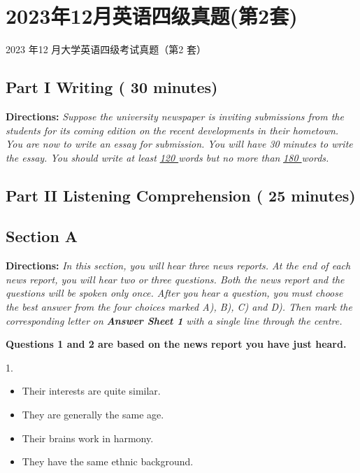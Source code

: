 \documentclass[UTF8,11pt]{ctexart}
\begin{document}
\section*{2023年12月英语四级真题(第2套)}
2023 年12 月大学英语四级考试真题（第2 套）


\subsection*{\textbf{Part I Writing} \textbf{( 30 minutes)}}


\textbf{Directions:} \textit{Suppose the university newspaper is inviting submissions from the students for its coming edition on} \textit{the recent developments in their hometown. You are now to write an essay for submission. You will have 30} \textit{minutes to write the essay. You should write at least }\textit{\uline{120 }}\textit{words but no more than }\textit{\uline{180 }}\textit{words.}


\subsection*{\textbf{Part II} \textbf{Listening Comprehension} \textbf{( 25 minutes)}}


\subsection*{\textbf{Section A}}


\textbf{Directions:} \textit{In this section, you will hear three news reports. At the end of each news report, you will hear two or} \textit{three questions. Both the news report and the questions will be spoken only once. After you hear a question, you} \textit{must choose the best answer from the four choices marked A), B), C) and D). Then mark the corresponding letter} \textit{on }\textbf{\textit{Answer Sheet 1}}\textit{ with a single line through the centre.}


\textbf{Questions 1 and 2 are based on the news report you have just heard.}


1.


\begin{itemize}[leftmargin=2em,itemsep=.2em,topsep=.4em]\item[A.] Their interests are quite similar.
\item[B.] They are generally the same age.
\item[C.] Their brains work in harmony.
\item[D.] They have the same ethnic background.
\end{itemize}
\end{document}
